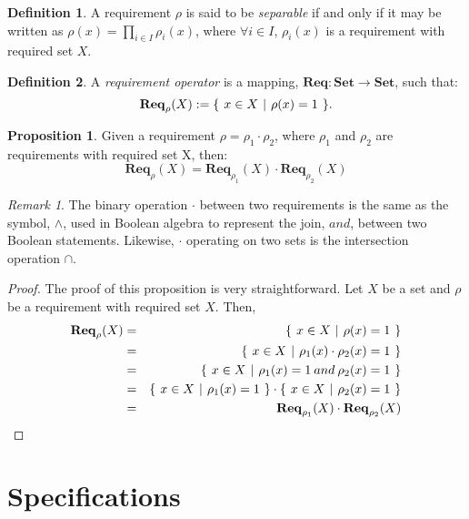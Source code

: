 \documentclass{article}
\theoremstyle{definition}
\newtheorem{definition}{Definition}[section]
\newtheorem{proposition}{Proposition}[section]
\theoremstyle{remark}
\newtheorem*{remark}{Remark}
\newcommand{\reqop}[2]{\mathbf{Req}_{#1}(#2)}
\newcommand{\setbuild}[3]
{
	\{\hspace{0.05in}
	#1 \in #2 \hspace{0.05in}
	| \hspace{0.05in}#3\hspace{0.05in}
	\}
}
\begin{document}
		\begin{definition}
			A requirement $\rho$ is said to be \emph{separable} if and only if it may be written as $\rho(x) = \prod_{i \in I}{\rho_{i}(x)}$, where $\forall i \in I$, $\rho_{i}(x)$ is a requirement with required set $X$.
		\end{definition}

		\begin{definition}
			A \emph{requirement operator} is a mapping, $\mathbf{Req}: \mathbf{Set} \rightarrow \mathbf{Set}$, such that: \[\reqop{\rho}{X} := \setbuild{x}	{X}{\rho(x) = 1}.\]
		\end{definition}

		\begin{proposition}
			Given a requirement $\rho = \rho_{1}\cdot\rho_{2}$, where $\rho_{1}$ and $\rho_{2}$ are requirements with required set X, then:
			\[
			\reqop{\rho}{X}\stackrel{~}{=}\reqop{\rho_{1}}{X}\cdot\reqop{\rho_{2}}{X}
			\]
		\end{proposition}

		\begin{remark}

			The binary operation $\cdot$ between two requirements is the same as the symbol, $\wedge$, used in Boolean
 			algebra to represent the join, $and$, between two Boolean statements. Likewise, $\cdot$ operating on two sets
 			is the intersection operation $\cap$.
		\end{remark}

		\begin{proof}
			The proof of this proposition is very straightforward. Let $X$ be a set and $\rho$ be a requirement with
 			required set $X$. Then,
			\begin{eqnarray}
			\reqop{\rho}{X} & = & \setbuild{x}{X}{\rho(x) = 1}\\
			& = & \setbuild{x}{X}{\rho_{1}(x)\cdot\rho_{2}(x) = 1}\\
			& = & \setbuild{x}{X}{\rho_{1}(x) = 1 \mathbin{and} \rho_{2}(x) = 1}\\
			& = & \setbuild{x}{X}{\rho_{1}(x) = 1}\cdot\setbuild{x}{X}{\rho_{2}(x) = 1}\\
			& = & \reqop{\rho_{1}}{X}\cdot\reqop{\rho_{2}}{X}
			\end{eqnarray}
		\end{proof}

	\section{Specifications}
\end{document}
